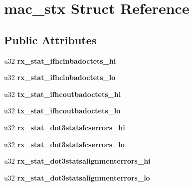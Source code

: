 \hypertarget{structmac__stx}{
\section{mac\_\-stx Struct Reference}
\label{structmac__stx}
}
\subsection*{Public Attributes}
\begin{DoxyCompactItemize}
\item 
\hypertarget{structmac__stx_a0ab9686a0a401a701fd979b500ba901d}{
u32 {\bfseries rx\_\-stat\_\-ifhcinbadoctets\_\-hi}}
\label{structmac__stx_a0ab9686a0a401a701fd979b500ba901d}

\item 
\hypertarget{structmac__stx_ab881143aa48a8fed3193807bdb6cf517}{
u32 {\bfseries rx\_\-stat\_\-ifhcinbadoctets\_\-lo}}
\label{structmac__stx_ab881143aa48a8fed3193807bdb6cf517}

\item 
\hypertarget{structmac__stx_ad4b8850e8258b99917273e8fa438f68a}{
u32 {\bfseries tx\_\-stat\_\-ifhcoutbadoctets\_\-hi}}
\label{structmac__stx_ad4b8850e8258b99917273e8fa438f68a}

\item 
\hypertarget{structmac__stx_a73f31a28b30dbea6ced8464ac3d1462d}{
u32 {\bfseries tx\_\-stat\_\-ifhcoutbadoctets\_\-lo}}
\label{structmac__stx_a73f31a28b30dbea6ced8464ac3d1462d}

\item 
\hypertarget{structmac__stx_afc43f51b1b09be30581ab7b7892c4bcd}{
u32 {\bfseries rx\_\-stat\_\-dot3statsfcserrors\_\-hi}}
\label{structmac__stx_afc43f51b1b09be30581ab7b7892c4bcd}

\item 
\hypertarget{structmac__stx_a8d7590389cd178e7840c68ff4ddbbe2b}{
u32 {\bfseries rx\_\-stat\_\-dot3statsfcserrors\_\-lo}}
\label{structmac__stx_a8d7590389cd178e7840c68ff4ddbbe2b}

\item 
\hypertarget{structmac__stx_ac3ec6be9d36dd03d63ebafff7671ee02}{
u32 {\bfseries rx\_\-stat\_\-dot3statsalignmenterrors\_\-hi}}
\label{structmac__stx_ac3ec6be9d36dd03d63ebafff7671ee02}

\item 
\hypertarget{structmac__stx_a5f0255561a80c9d80174fb1c7bef5f16}{
u32 {\bfseries rx\_\-stat\_\-dot3statsalignmenterrors\_\-lo}}
\label{structmac__stx_a5f0255561a80c9d80174fb1c7bef5f16}


\end{DoxyCompactItemize}
